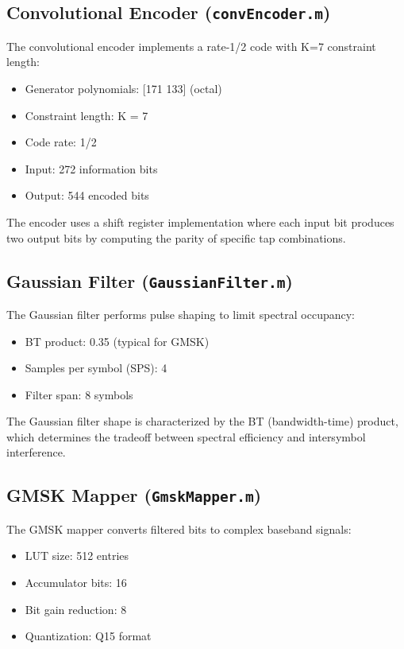 \documentclass[12pt]{article}
\begin{document}
\subsection{Convolutional Encoder (\texttt{convEncoder.m})}
The convolutional encoder implements a rate-1/2 code with K=7 constraint length:
\begin{itemize}
    \item Generator polynomials: [171 133] (octal)
    \item Constraint length: K = 7
    \item Code rate: 1/2
    \item Input: 272 information bits
    \item Output: 544 encoded bits
\end{itemize}

The encoder uses a shift register implementation where each input bit produces two output bits by computing the parity of specific tap combinations.

\subsection{Gaussian Filter (\texttt{GaussianFilter.m})}
The Gaussian filter performs pulse shaping to limit spectral occupancy:
\begin{itemize}
    \item BT product: 0.35 (typical for GMSK)
    \item Samples per symbol (SPS): 4
    \item Filter span: 8 symbols
\end{itemize}

The Gaussian filter shape is characterized by the BT (bandwidth-time) product, which determines the tradeoff between spectral efficiency and intersymbol interference.

\subsection{GMSK Mapper (\texttt{GmskMapper.m})}
The GMSK mapper converts filtered bits to complex baseband signals:
\begin{itemize}
    \item LUT size: 512 entries
    \item Accumulator bits: 16
    \item Bit gain reduction: 8
    \item Quantization: Q15 format
\end{itemize}
\end{document}
